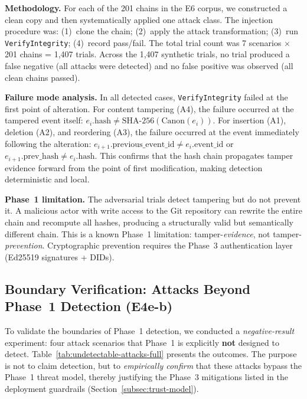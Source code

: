 \textbf{Methodology.} For each of the 201 chains in the E6 corpus, we constructed a clean copy and then systematically applied one attack class. The injection procedure was: (1)~clone the chain; (2)~apply the attack transformation; (3)~run \texttt{VerifyIntegrity}; (4)~record pass/fail. The total trial count was 7 scenarios $\times$ 201 chains = 1,407 trials. Across the 1,407 synthetic trials, no trial produced a false negative (all attacks were detected) and no false positive was observed (all clean chains passed).

\textbf{Failure mode analysis.} In all detected cases, \texttt{VerifyIntegrity} failed at the first point of alteration. For content tampering (A4), the failure occurred at the tampered event itself: $e_i.\text{hash} \neq \text{SHA-256}(\text{Canon}(e_i))$. For insertion (A1), deletion (A2), and reordering (A3), the failure occurred at the event immediately following the alteration: $e_{i+1}.\text{previous\_event\_id} \neq e_i.\text{event\_id}$ or $e_{i+1}.\text{prev\_hash} \neq e_i.\text{hash}$. This confirms that the hash chain propagates tamper evidence forward from the point of first modification, making detection deterministic and local.

\textbf{Phase~1 limitation.} The adversarial trials detect tampering but do not prevent it. A malicious actor with write access to the Git repository can rewrite the entire chain and recompute all hashes, producing a structurally valid but semantically different chain. This is a known Phase~1 limitation: tamper-\emph{evidence}, not tamper-\emph{prevention}. Cryptographic prevention requires the Phase~3 authentication layer (Ed25519 signatures + DIDs).

\subsection{Boundary Verification: Attacks Beyond Phase~1 Detection (E4e-b)}

To validate the boundaries of Phase~1 detection, we conducted a \emph{negative-result} experiment: four attack scenarios that Phase~1 is explicitly \textbf{not} designed to detect. Table~\ref{tab:undetectable-attacks-full} presents the outcomes. The purpose is not to claim detection, but to \emph{empirically confirm} that these attacks bypass the Phase~1 threat model, thereby justifying the Phase~3 mitigations listed in the deployment guardrails (Section~\ref{subsec:trust-model}).

